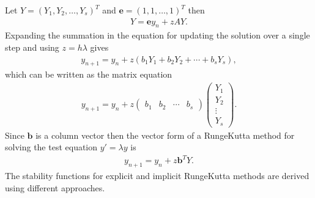 \documentclass[letterpaper,10pt,english]{jupyterBook}
\begin{document}
\sphinxAtStartPar
Let \(Y=(Y_1 ,Y_2 ,\dots ,Y_s )^T\) and \(\mathbf{e}=(1,1,\dots ,1)^T\) then
\begin{equation}\label{equation:4_Stability/4.2_RK_stability_function:rk-stability-Y-equation}
\begin{split}Y = \mathbf{e} y_n + z A Y.\end{split}
\end{equation}
\sphinxAtStartPar
Expanding the summation in the equation for updating the solution over a single step and using \(z = h \lambda\) gives
\begin{align*}
    y_{n+1} = y_n + z (b_1 Y_1 + b_2 Y_2 + \cdots + b_s Y_s),
\end{align*}
\sphinxAtStartPar
which can be written as the matrix equation
\begin{align*}
    y_{n+1} = y_n + z
    \begin{pmatrix}
        b_1 & b_2 & \cdots & b_s 
    \end{pmatrix}
    \begin{pmatrix}
        Y_1 \\ Y_2 \\ \vdots \\ Y_s
    \end{pmatrix}. 
\end{align*}
\sphinxAtStartPar
Since \(\mathbf{b}\) is a column vector then the vector form of a Runge\sphinxhyphen{}Kutta method for solving the test equation \(y' = \lambda y\) is
\begin{equation}\label{equation:4_Stability/4.2_RK_stability_function:rk-stability-yn+1-equation}
\begin{split}y_{n+1} =y_n + z \mathbf{b}^T Y.\end{split}
\end{equation}
\sphinxAtStartPar
The stability functions for explicit and implicit Runge\sphinxhyphen{}Kutta methods are derived using different approaches.
\end{document}
